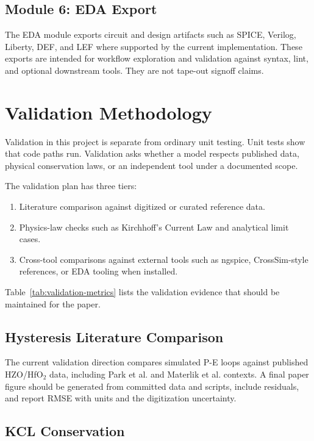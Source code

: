 \documentclass[11pt]{article}
\begin{document}
\subsection{Module 6: EDA Export}

The EDA module exports circuit and design artifacts such as SPICE, Verilog, Liberty, DEF, and LEF where supported by the current implementation. These exports are intended for workflow exploration and validation against syntax, lint, and optional downstream tools. They are not tape-out signoff claims.

\section{Validation Methodology}

Validation in this project is separate from ordinary unit testing. Unit tests show that code paths run. Validation asks whether a model respects published data, physical conservation laws, or an independent tool under a documented scope.

The validation plan has three tiers:

\begin{enumerate}
  \item Literature comparison against digitized or curated reference data.
  \item Physics-law checks such as Kirchhoff's Current Law and analytical limit cases.
  \item Cross-tool comparisons against external tools such as ngspice, CrossSim-style references, or EDA tooling when installed.
\end{enumerate}

Table~\ref{tab:validation-metrics} lists the validation evidence that should be maintained for the paper.



\subsection{Hysteresis Literature Comparison}

The current validation direction compares simulated P-E loops against published HZO/HfO$_2$ data, including Park et al. \citep{park2015} and Materlik et al. \citep{materlik2015} contexts. A final paper figure should be generated from committed data and scripts, include residuals, and report RMSE with units and the digitization uncertainty.

\subsection{KCL Conservation}
\end{document}
